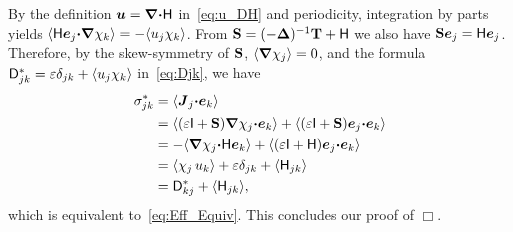 \documentclass[amsa]{ipart}
\begin{document}
By the definition $\boldsymbol{u} =\mbox{\boldmath${\nabla}$} \mbox{\boldmath${\cdot}$}\mathsf{H}$ in~\eqref{eq:u_DH} and
periodicity, integration by parts yields
$\langle\mathsf{H}\boldsymbol{e}_j\mbox{\boldmath${\cdot}$}\mbox{\boldmath${\nabla}$}\chi_k\rangle=-\langle u_j\chi_k\rangle$. From
$\mathbf{S}=(-\mbox{\boldmath${\Delta}$})^{-1}\mathbf{T}+\mathsf{H}$ we also have  
$\mathbf{S}\boldsymbol{e}_j=\mathsf{H}\boldsymbol{e}_j$. Therefore, by the skew-symmetry of $\mathbf{S}$,
$\langle\mbox{\boldmath${\nabla}$}\chi_j\rangle=0$, and the formula $\mathsf{D}^*_{jk}=\varepsilon\delta_{jk}+\langle u_j\chi_k\rangle$
in~\eqref{eq:Djk}, we have   
%
\begin{align}
  \sigma^*_{jk}&=\langle\vecJ_j\bcdot\vece_k\rangle
      \\\notag
      &=\langle(\varepsilon\Ib+\Sb)\bnabla\chi_j\bcdot\vece_k\rangle
      +\langle(\varepsilon\Ib+\Sb)\vece_j\bcdot\vece_k\rangle
      \\\notag
      &=-\langle\bnabla\chi_j\bcdot\Hm\vece_k\rangle
      +\langle(\varepsilon\Ib+\Hm)\vece_j\bcdot\vece_k\rangle
      \\\notag
      &=\langle\chi_j\,u_k\rangle+\varepsilon\delta_{jk}+\langle\Hm_{jk}\rangle
      \\\notag
      &=\Dm^*_{kj}+\langle\Hm_{jk}\rangle,
\end{align}
%
which is equivalent to~\eqref{eq:Eff_Equiv}. This concludes
our proof of  $\Box$.     
\end{document}
